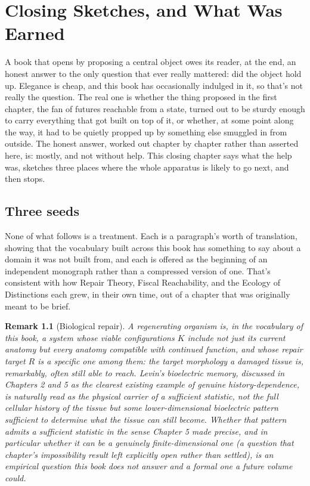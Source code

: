 \documentclass[11pt]{report}
\newtheorem{remark}{Remark}[chapter]
\begin{document}
\chapter{Closing Sketches, and What Was Earned}

A book that opens by proposing a central object owes its reader, at
the end, an honest answer to the only question that ever really
mattered: did the object hold up. Elegance is cheap, and this book has
occasionally indulged in it, so that's not really the question. The
real one is whether the thing proposed in the first chapter, the fan
of futures reachable from a state, turned out to be sturdy enough to
carry everything that got built on top of it, or whether, at some
point along the way, it had to be quietly propped up by something else
smuggled in from outside. The honest answer, worked out chapter by
chapter rather than asserted here, is: mostly, and not without help.
This closing chapter says what the help was, sketches three places
where the whole
apparatus is likely to go next, and then stops.

\section*{Three seeds}

None of what follows is a treatment. Each is a paragraph's worth of
translation, showing that the vocabulary built across this book has
something to say about a domain it was not built from, and each is
offered as the beginning of an independent monograph rather than a
compressed version of one. That's consistent with how Repair Theory, Fiscal
Reachability, and the Ecology of Distinctions each grew, in their own
time, out of a chapter that was originally meant to be brief.

\begin{remark}[Biological repair]
A regenerating organism is, in the vocabulary of this book, a system
whose viable configurations $K$ include not just its current anatomy
but every anatomy compatible with continued function, and whose repair
target $R$ is a specific one among them: the target morphology a
damaged tissue is, remarkably, often still able to reach. Levin's
bioelectric memory, discussed in Chapters 2 and 5 as the clearest
existing example of genuine history-dependence, is naturally read as
the physical carrier of a sufficient statistic, not the full cellular
history of the tissue but some lower-dimensional bioelectric pattern
sufficient to determine what the tissue can still become. Whether that
pattern admits a sufficient statistic in the sense Chapter 5 made
precise, and in particular whether it can be a genuinely
finite-dimensional one (a question that chapter's impossibility result
left explicitly open rather than settled), is an empirical question
this book does not answer and a formal one a future volume could.
\end{remark}
\end{document}
